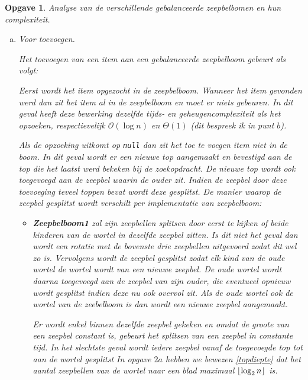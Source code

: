 \documentclass[12pt,hidelinks]{article}
\DeclarePairedDelimiter\floor{\lfloor}{\rfloor}
\newtheorem{opgave}{Opgave}
\begin{document}
    \begin{opgave}
        Analyse van de verschillende gebalanceerde zeepbelbomen en hun complexiteit.
        \begin{enumerate}[a.]
            \item Voor toevoegen.

                \normalfont
                Het toevoegen van een item aan een gebalanceerde zeepbelboom gebeurt als volgt:

                Eerst wordt het item opgezocht in de zeepbelboom.
                Wanneer het item gevonden werd dan zit het item al in de zeepbelboom en moet er niets gebeuren.
                In dit geval heeft deze bewerking dezelfde tijds- en geheugencomplexiteit als het opzoeken, respectievelijk $\mathcal{O}(\log n)$ en $\Theta(1)$ (dit bespreek ik in punt $b$).

                Als de opzoeking uitkomt op {\tt null} dan zit het toe te voegen item niet in de boom.
                In dit geval wordt er een nieuwe top aangemaakt en bevestigd aan de top die het laatst werd bekeken bij de zoekopdracht.
                De nieuwe top wordt ook toegevoegd aan de zeepbel waarin de ouder zit.
                Indien de zeepbel door deze toevoeging teveel toppen bevat wordt deze gesplitst.
                De manier waarop de zeepbel gesplitst wordt verschilt per implementatie van zeepbelboom:
                \begin{itemize}
                    \item \textbf{Zeepbelboom1} zal zijn zeepbellen splitsen door eerst te kijken of beide kinderen van de wortel in dezelfde zeepbel zitten.
                        Is dit niet het geval dan wordt een rotatie met de bovenste drie zeepbellen uitgevoerd zodat dit wel zo is.
                        Vervolgens wordt de zeepbel gesplitst zodat elk kind van de oude wortel de wortel wordt van een nieuwe zeepbel.
                        De oude wortel wordt daarna toegevoegd aan de zeepbel van zijn ouder, die eventueel opnieuw wordt gesplitst indien deze nu ook overvol zit.
                        Als de oude wortel ook de wortel van de zeebelboom is dan wordt een nieuwe zeepbel aangemaakt.

                        Er wordt enkel binnen dezelfde zeepbel gekeken en omdat de groote van een zeepbel constant is, gebeurt het splitsen van een zeepbel in constante tijd.
                        In het slechtste geval wordt iedere zeepbel vanaf de toegevoegde top tot aan de wortel gesplitst
                        In opgave $2a$ hebben we bewezen \eqref{topdiepte}  dat het aantal zeepbellen van de wortel naar een blad maximaal $\floor{\log_2 n}$ is.


\end{itemize}
\end{enumerate}
\end{opgave}
\end{document}
